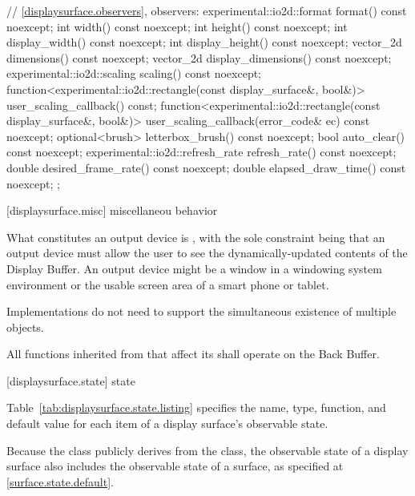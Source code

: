 \begin{codeblock}
{{{{{    // \ref{displaysurface.observers}, observers:
    experimental::io2d::format format() const noexcept;
    int width() const noexcept;
    int height() const noexcept;
    int display_width() const noexcept;
    int display_height() const noexcept;
    vector_2d dimensions() const noexcept;
    vector_2d display_dimensions() const noexcept;
    experimental::io2d::scaling scaling() const noexcept;
    function<experimental::io2d::rectangle(const display_surface&,
      bool&)> user_scaling_callback() const;
    function<experimental::io2d::rectangle(const display_surface&,
      bool&)> user_scaling_callback(error_code& ec) const noexcept;
    optional<brush> letterbox_brush() const noexcept;
    bool auto_clear() const noexcept;
    experimental::io2d::refresh_rate refresh_rate() const noexcept;
    double desired_frame_rate() const noexcept;
    double elapsed_draw_time() const noexcept;
  };
} } } }
\end{codeblock}

 [displaysurface.misc] { miscellaneou behavior}

\pnum
What constitutes an output device is , with the sole constraint being that an output device must allow the user to see the dynamically-updated contents of the Display Buffer.
\enterexample
An output device might be a window in a windowing system environment or the usable screen area of a smart phone or tablet.
\exitexample

\pnum
Implementations do not need to support the simultaneous existence of multiple  objects.

\pnum
All functions inherited from  that affect its \underlyingsurface shall operate on the Back Buffer.

 [displaysurface.state] { state}

\pnum
Table~\ref{tab:displaysurface.state.listing} specifies the name, type, function, and default value for each item of a display surface's observable state.

\pnum
Because the  class publicly derives from the  class, the observable state of a display surface also includes the observable state of a surface, as specified at \ref{surface.state.default}.


